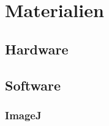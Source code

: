 \section{Materialien}\label{sec:Materials}

\subsection{Hardware}\label{sec:Hardware}
\subsection{Software}
\subsubsection{ImageJ}
\newpage
